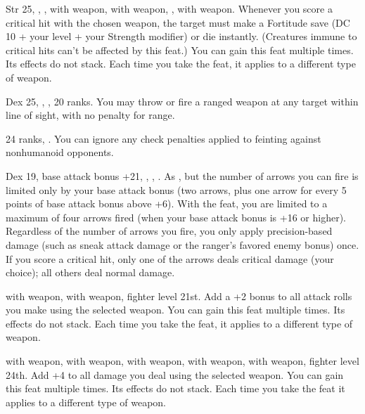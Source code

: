 {}
{Str 25, , ,  with weapon,  with weapon, ,  with weapon.}
{Whenever you score a critical hit with the chosen weapon, the target must make a Fortitude save (DC 10 + \onehalf your level + your Strength modifier) or die instantly. (Creatures immune to critical hits can't be affected by this feat.)}
{}{You can gain this feat multiple times. Its effects do not stack. Each time you take the feat, it applies to a different type of weapon.}

{Dex 25, , ,  20 ranks.}
{You may throw or fire a ranged weapon at any target within line of sight, with no penalty for range.}

{ 24 ranks, .}
{You can ignore any check penalties applied to feinting against nonhumanoid opponents.}

{}
{Dex 19, base attack bonus +21, , , .}
{As , but the number of arrows you can fire is limited only by your base attack bonus (two arrows, plus one arrow for every 5 points of base attack bonus above +6).}
{With the  feat, you are limited to a maximum of four arrows fired (when your base attack bonus is +16 or higher).}
{Regardless of the number of arrows you fire, you only apply precision-based damage (such as sneak attack damage or the ranger's favored enemy bonus) once. If you score a critical hit, only one of the arrows deals critical damage (your choice); all others deal normal damage.}

{}
{ with weapon,  with weapon, fighter level 21st.}
{Add a +2 bonus to all attack rolls you make using the selected weapon.}
{}{You can gain this feat multiple times. Its effects do not stack. Each time you take the feat, it applies to a different type of weapon.}

{}
{ with weapon,  with weapon,  with weapon,  with weapon,  with weapon, fighter level 24th.}
{Add +4 to all damage you deal using the selected weapon.}
{}{You can gain this feat multiple times. Its effects do not stack. Each time you take the feat it applies to a different type of weapon.}

